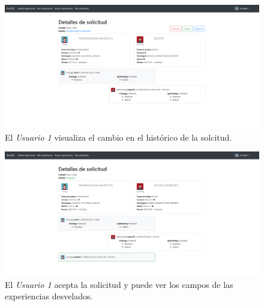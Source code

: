 \documentclass[a4paper, 12pt]{book}
\begin{document}
    \begin{figure}
        \centering
        \includegraphics[width=15cm, keepaspectratio]{img/6.5.png}
        \caption{El \emph{Usuario 1} visualiza el cambio en el histórico de la solcitud.}
        \label{fig:use_cases_6_5}
    \end{figure}

    \begin{figure}
        \centering
        \includegraphics[width=15cm, keepaspectratio]{img/6.6.png}
        \caption{El \emph{Usuario 1} acepta la solicitud y puede ver los campos de las experiencias desvelados.}
        \label{fig:use_cases_6_6}
    \end{figure}
\end{document}
